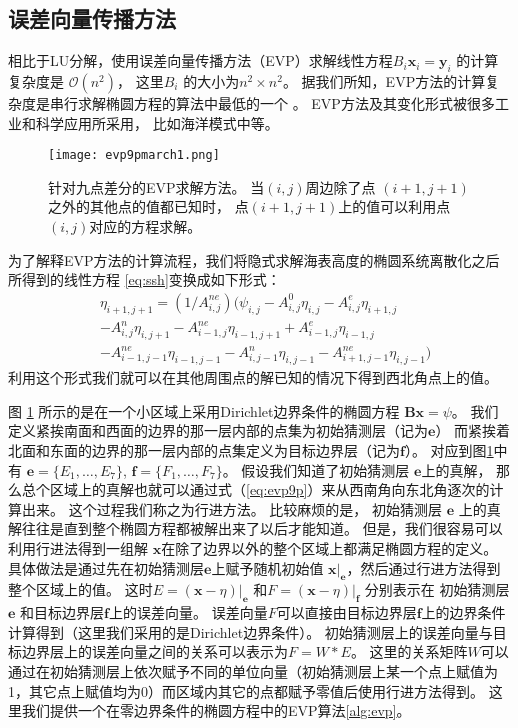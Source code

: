  

\subsection{误差向量传播方法}
\label{precond:EVP:EVP}

相比于LU分解，使用误差向量传播方法（EVP）求解线性方程$B_i \textbf{x}_i =\textbf{y}_i$ 的计算复杂度是 $\mathcal{O}(n^2)$， 这里$B_i$ 的大小为$n^2\times n^2$。 
据我们所知，EVP方法的计算复杂度是串行求解椭圆方程的算法中最低的一个 \cite{roache1995elliptic}。 
EVP方法及其变化形式被很多工业和科学应用所采用， 比如海洋模式中\cite{dietrich1987ocean,tseng2011parallel}等。 


\begin {figure}
\centering
\texttt{[image: evp9pmarch1.png]}
\caption []{针对九点差分的EVP求解方法。 当$(i,j)$周边除了点 $(i+1,j+1)$之外的其他点的值都已知时， 点$(i+1,j+1)$上的值可以利用点$(i,j)$对应的方程求解。 \label {fig:evp9p}}
\end {figure}

为了解释EVP方法的计算流程，我们将隐式求解海表高度的椭圆系统离散化之后所得到的线性方程 \ref{eq:ssh}变换成如下形式：
\begin{eqnarray}
\label{eq:evp9p}
&\eta_{i+1,j+1} = (1/A_{i,j}^{ne} )(\psi_{i,j} - A_{i,j}^0\eta_{i,j}-A_{i,j}^e\eta_{i+1,j} \nonumber\\
&-A_{i,j}^n\eta_{i,j+1}-A_{i-1,j}^{ne}\eta_{i-1,j+1} +A_{i-1,j}^e\eta_{i-1,j}\nonumber\\
&-A_{i-1,j-1}^{ne}\eta_{i-1,j-1}-A_{i,j-1}^n\eta_{i,j-1}- A_{i+1,j-1}^{ne}\eta_{i,j-1} )
\end{eqnarray}
利用这个形式我们就可以在其他周围点的解已知的情况下得到西北角点上的值。 


图 \ref{fig:evp9p} 所示的是在一个小区域上采用Dirichlet边界条件的椭圆方程
 $\textbf{B}\textbf{x} = \psi$。
我们定义紧挨南面和西面的边界的那一层内部的点集为初始猜测层（记为$\textbf{e}$） 
而紧挨着北面和东面的边界的那一层内部的点集定义为目标边界层（记为$\textbf{f}$）。 
对应到图\ref{fig:evp9p}中有
$\textbf{e}= \{E_1, \dots, E_7\}$, $\textbf{f}= \{F_1, \dots, F_7\}$。 
假设我们知道了初始猜测层 $\textbf{e}$上的真解，  
那么总个区域上的真解也就可以通过式（\ref{eq:evp9p}）来从西南角向东北角逐次的计算出来。 
这个过程我们称之为行进方法。
比较麻烦的是， 初始猜测层 $\textbf{e}$ 上的真解往往是直到整个椭圆方程都被解出来了以后才能知道。
但是，我们很容易可以利用行进法得到一组解
$\textbf{x}$在除了边界以外的整个区域上都满足椭圆方程的定义。 
具体做法是通过先在初始猜测层$\textbf{e}$上赋予随机初始值
$\textbf{x}|_\textbf{e}$，然后通过行进方法得到整个区域上的值。 
这时$E=(\textbf{x} -\eta)|_\textbf{e}$
和$F=(\textbf{x} -\eta)|_\textbf{f}$ 分别表示在
初始猜测层$\textbf{e}$ 和目标边界层$\textbf{f}$上的误差向量。
误差向量$F$可以直接由目标边界层$\textbf{f}$上的边界条件计算得到（这里我们采用的是Dirichlet边界条件）。 
初始猜测层上的误差向量与目标边界层上的误差向量之间的关系可以表示为$F=W*E$。
这里的关系矩阵$W$可以通过在初始猜测层上依次赋予不同的单位向量（初始猜测层上某一个点上赋值为1，其它点上赋值均为0）而区域内其它的点都赋予零值后使用行进方法得到。 
这里我们提供一个在零边界条件的椭圆方程中的EVP算法\ref{alg:evp}。 


